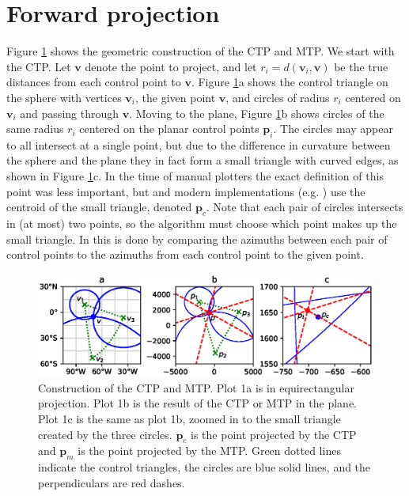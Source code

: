 \documentclass[]{interact}
\begin{document}
\section{Forward projection}
Figure \ref{fig:chamberlin} shows the geometric construction of the CTP and
MTP. We start with the CTP. Let $\mathbf v$ denote the point to project, and
let $r_i = d(\mathbf v_i, \mathbf v)$ be the true distances from each control
point to $\mathbf v$. Figure \ref{fig:chamberlin}a shows the control triangle
on the sphere with vertices $\mathbf v_i$, the given point $\mathbf v$, and
circles of radius $r_i$ centered on $\mathbf v_i$ and passing through
$\mathbf v$. Moving to the plane, Figure \ref{fig:chamberlin}b shows circles of
the same radius $r_i$ centered on the planar control points $\mathbf p_i$. The
circles may appear to all intersect at a single point, but due to the difference
in curvature between the sphere and the plane they in fact form a small triangle
with curved edges, as shown in Figure \ref{fig:chamberlin}c. In the time of
manual plotters the exact definition of this point was less important, but
\citet{christensen} and modern implementations (e.g. \citealp{proj}) use the
centroid of the small triangle, denoted $\mathbf p_c$.
Note that each pair of circles intersects in (at most) two points,
so the algorithm must choose which point makes up the small triangle.
In \citet{christensen} this is done by comparing the azimuths between each pair
of control points to the azimuths from each control point to the given point.

\begin{figure}
  \includegraphics[width=\textwidth]{construction}
  \caption{Construction of the CTP and MTP. Plot 1a is in equirectangular
  projection. Plot 1b is the result of the CTP or MTP in the plane. Plot 1c is
  the same as plot 1b, zoomed in to the small triangle created by the three
  circles. $\mathbf p_c$ is the point projected by the CTP and $\mathbf p_m$ is
  the point projected by the MTP. Green dotted lines indicate the control
  triangles, the circles are blue solid lines,
  and the perpendiculars are red dashes.}
  \label{fig:chamberlin}
\end{figure}
\end{document}
